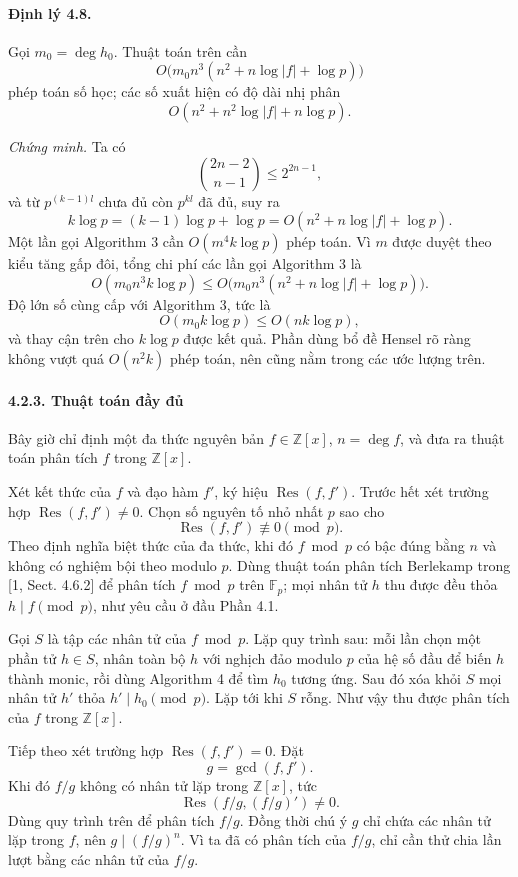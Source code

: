 \documentclass[11pt]{article}
\begin{document}
\paragraph{Định lý 4.8.}
Gọi \(m_0=\deg h_0\). Thuật toán trên cần
\[
  O\bigl(m_0n^3(n^2+n\log |f|+\log p)\bigr)
\]
phép toán số học; các số xuất hiện có độ dài nhị phân
\[
  O(n^2+n^2\log |f|+n\log p).
\]

\emph{Chứng minh.}
Ta có
\[
  \binom{2n-2}{n-1}\le 2^{2n-1},
\]
và từ \(p^{(k-1)l}\) chưa đủ còn \(p^{kl}\) đã đủ, suy ra
\[
  k\log p=(k-1)\log p+\log p
  =O(n^2+n\log |f|+\log p).
\]
Một lần gọi Algorithm 3 cần \(O(m^4k\log p)\) phép toán. Vì \(m\) được duyệt
theo kiểu tăng gấp đôi, tổng chi phí các lần gọi Algorithm 3 là
\[
  O(m_0n^3k\log p)
  \le O\bigl(m_0n^3(n^2+n\log |f|+\log p)\bigr).
\]
Độ lớn số cùng cấp với Algorithm 3, tức là
\[
  O(m_0k\log p)\le O(nk\log p),
\]
và thay cận trên cho \(k\log p\) được kết quả. Phần dùng bổ đề Hensel rõ ràng
không vượt quá \(O(n^2k)\) phép toán, nên cũng nằm trong các ước lượng trên.

\paragraph{4.2.3. Thuật toán đầy đủ}

Bây giờ chỉ định một đa thức nguyên bản \(f\in\mathbb Z[x]\), \(n=\deg f\), và
đưa ra thuật toán phân tích \(f\) trong \(\mathbb Z[x]\).

Xét kết thức của \(f\) và đạo hàm \(f'\), ký hiệu \(\operatorname{Res}(f,f')\).
Trước hết xét trường hợp \(\operatorname{Res}(f,f')\ne0\). Chọn số nguyên tố
nhỏ nhất \(p\) sao cho
\[
  \operatorname{Res}(f,f')\not\equiv0\pmod p.
\]
Theo định nghĩa biệt thức của đa thức, khi đó \(f\bmod p\) có bậc đúng bằng
\(n\) và không có nghiệm bội theo modulo \(p\). Dùng thuật toán phân tích
Berlekamp trong [1, Sect. 4.6.2] để phân tích \(f\bmod p\) trên
\(\mathbb F_p\); mọi nhân tử \(h\) thu được đều thỏa \(h\mid f\pmod p\), như
yêu cầu ở đầu Phần 4.1.

Gọi \(S\) là tập các nhân tử của \(f\bmod p\). Lặp quy trình sau: mỗi lần chọn
một phần tử \(h\in S\), nhân toàn bộ \(h\) với nghịch đảo modulo \(p\) của hệ
số đầu để biến \(h\) thành monic, rồi dùng Algorithm 4 để tìm \(h_0\) tương
ứng. Sau đó xóa khỏi \(S\) mọi nhân tử \(h'\) thỏa \(h'\mid h_0\pmod p\). Lặp
tới khi \(S\) rỗng. Như vậy thu được phân tích của \(f\) trong \(\mathbb Z[x]\).

Tiếp theo xét trường hợp \(\operatorname{Res}(f,f')=0\). Đặt
\[
  g=\gcd(f,f').
\]
Khi đó \(f/g\) không có nhân tử lặp trong \(\mathbb Z[x]\), tức
\[
  \operatorname{Res}(f/g,(f/g)')\ne0.
\]
Dùng quy trình trên để phân tích \(f/g\). Đồng thời chú ý \(g\) chỉ chứa các
nhân tử lặp trong \(f\), nên \(g\mid (f/g)^n\). Vì ta đã có phân tích của
\(f/g\), chỉ cần thử chia lần lượt bằng các nhân tử của \(f/g\).
\end{document}
